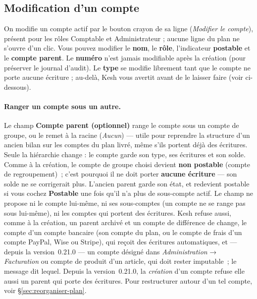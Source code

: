 \documentclass[a4paper,11pt,oneside]{article}
\begin{document}
\subsection{Modification d'un compte}\label{sec:modification-compte}

On modifie un compte actif par le bouton crayon de sa ligne (\emph{Modifier le compte}), présent pour
les rôles Comptable et Administrateur ; aucune ligne du plan ne s'ouvre d'un clic. Vous pouvez modifier le \textbf{nom}, le \textbf{rôle},
l'indicateur \textbf{postable} et le \textbf{compte parent}. Le \textbf{numéro} n'est jamais modifiable après la création
(pour préserver le journal d'audit). Le \textbf{type} se modifie librement tant que le compte ne porte aucune écriture ; au-delà, Kesh vous avertit avant de le laisser faire (voir ci-dessous).

\paragraph{Ranger un compte sous un autre.} Le champ \textbf{Compte parent (optionnel)} range le
compte sous un compte de groupe, ou le remet à la racine (\emph{Aucun}) --- utile pour reprendre la
structure d'un ancien bilan sur les comptes du plan livré, même s'ils portent déjà des écritures.
Seule la hiérarchie change : le compte garde son type, ses écritures et son solde. Comme à la
création, le compte de groupe choisi devient \textbf{non postable} (compte de regroupement)~;
c'est pourquoi il ne doit porter \textbf{aucune écriture} --- son solde ne se corrigerait plus.
L'ancien parent garde son état, et redevient postable si vous cochez \textbf{Postable} une fois
qu'il n'a plus de sous-compte actif. Le champ ne propose ni le compte lui-même, ni ses
sous-comptes (un compte ne se range pas sous lui-même), ni les comptes qui portent des écritures.
Kesh refuse aussi, comme à la création, un parent archivé et un compte de différence de change,
le compte d'un compte bancaire (son compte du plan, ou le compte de frais d'un compte
PayPal, Wise ou Stripe), qui reçoit des écritures automatiques, et --- depuis la version~0.21.0
--- un compte désigné dans \emph{Administration} → \emph{Facturation} ou compte de produit d'un
article, qui doit rester imputable~; le message dit lequel. Depuis la version~0.21.0, la
\emph{création} d'un compte refuse elle aussi un parent qui porte des écritures. Pour restructurer autour d'un tel compte, voir \S\ref{sec:reorganiser-plan}.
\end{document}
